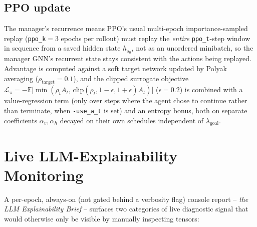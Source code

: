 \documentclass[11pt]{article}
\newcommand{\code}[1]{\texttt{#1}}
\begin{document}
\subsection{PPO update}
\label{sec:ppo}
The manager's recurrence means PPO's usual multi-epoch importance-sampled replay
(\code{ppo\_k}$=3$ epochs per rollout) must replay the \emph{entire} \code{ppo\_t}-step
window in sequence from a saved hidden state $h_{s_0}$, not as an unordered
minibatch, so the manager GNN's recurrent state stays consistent with the actions
being replayed. Advantage is computed against a soft target network updated by Polyak
averaging ($\rho_{\text{target}}=0.1$), and the clipped surrogate objective
$\mathcal{L}_\pi = -\mathbb{E}\big[\min(\rho_t A_t,\, \text{clip}(\rho_t, 1{-}\epsilon,
1{+}\epsilon)A_t)\big]$ ($\epsilon{=}0.2$) is combined with a value-regression term
(only over steps where the agent chose to continue rather than terminate, when
\code{-use\_a\_t} is set) and an entropy bonus, both on separate coefficients
$\alpha_v, \alpha_h$ decayed on their own schedules independent of $\lambda_{\text{goal}}$.

\section{Live LLM-Explainability Monitoring}
\label{sec:explainability}

A per-epoch, always-on (not gated behind a verbosity flag) console report --
\emph{the LLM Explainability Brief} -- surfaces two categories of live diagnostic
signal that would otherwise only be visible by manually inspecting tensors:
\end{document}
